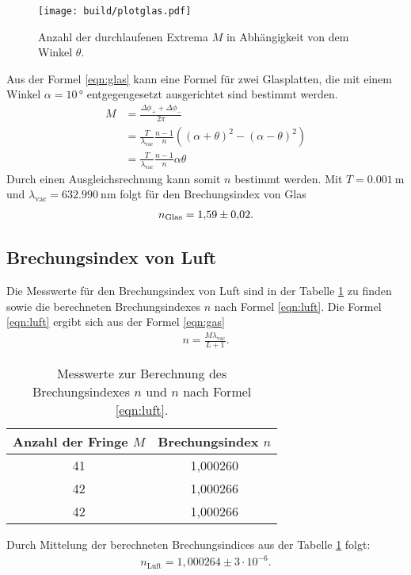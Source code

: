 \begin{figure}
    \centering
    \texttt{[image: build/plotglas.pdf]}
    \caption{Anzahl der durchlaufenen Extrema $M$ in Abhängigkeit von dem Winkel $\theta$.}
    \label{fig:glas}
\end{figure}

Aus der Formel \eqref{eqn:glas} kann eine Formel für
zwei Glasplatten, die mit einem Winkel $\alpha=10\,\si{\degree}$ entgegengesetzt
ausgerichtet sind bestimmt werden.
\begin{align}
  M&=\frac{\Delta \phi_+ +\Delta \phi_-}{2\pi}\\
    &=\frac{T}{\lambda_\mathrm{vac}}\frac{n-1}{n}((\alpha+\theta)^2-(\alpha-\theta)^2)\\
    &=\frac{T}{\lambda_\mathrm{vac}}\frac{n-1}{n} \alpha \theta
\end{align}
Durch einen Ausgleichsrechnung kann somit $n$ bestimmt werden.
Mit $T=\SI{0,001}{\meter}$ und $\lambda_\mathrm{vac}=\SI{632.990}{\nano\meter}$
folgt für den Brechungsindex von Glas
\begin{align}
n_\mathrm{Glas}=\num{1,59\pm0,02}.
\end{align}




\subsection{Brechungsindex von Luft}
Die Messwerte für den Brechungsindex von Luft sind in der Tabelle \ref{tab:luft}
zu finden sowie die berechneten Brechungsindexes $n$ nach Formel \eqref{eqn:luft}.
Die Formel \eqref{eqn:luft} ergibt sich aus der Formel \eqref{eqn:gas}
\begin{align}%
    n=\frac{M\lambda_\mathrm{vac}}{L+1} \label{eqn:luft}.
\end{align}

\begin{table}
\centering
\caption{Messwerte zur Berechnung des Brechungsindexes $n$ und $n$ nach Formel \eqref{eqn:luft}.}
\label{tab:luft}
\begin{tabular}{c c}
\toprule
  Anzahl der Fringe $M$ & Brechungsindex $n$ \\
\midrule
41 &  1,000260\\
42 &  1,000266\\
42 &  1,000266\\
\bottomrule
\end{tabular}
\end{table}
Durch Mittelung der berechneten Brechungsindices aus der Tabelle \ref{tab:luft}
folgt:
\begin{align*}
  n_\mathrm{Luft}=1,000264\pm 3\cdot10^{-6}.
\end{align*}
